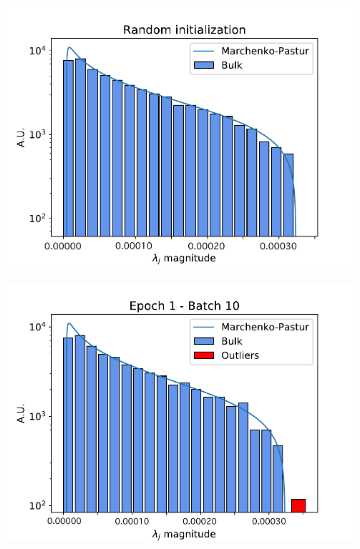 \documentclass{revtex4-1}
\begin{document}
\begin{figure}
  \centering
  \begin{subfigure}{.32\linewidth}
    \includegraphics[width=\linewidth]{mp_fit.eps}
    \caption{}
    \label{fig:mp_fit}
  \end{subfigure}
  \begin{subfigure}{.32\linewidth}
    \includegraphics[width=\linewidth]{sv_distr_e1_b10.eps}
    \caption{}
    \label{fig:sv1}
  \end{subfigure}
  \begin{subfigure}{.32\linewidth}

\end{subfigure}
\end{figure}
\end{document}
